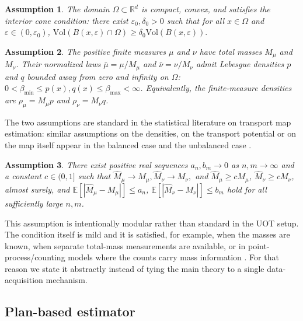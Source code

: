 \documentclass[11pt,reqno]{amsart}
\newtheorem{assumption}{Assumption}
\theoremstyle{definition}
\renewcommand{\hat}{\widehat}
\newcommand{\Ep}{\mathbb{E}}
\renewcommand{\epsilon}{\varepsilon}
\begin{document}
\begin{assumption}
\label{assm:supp_global}
The domain $\Omega \subset \mathbb{R}^d$ is compact, convex, and satisfies the interior cone condition: there exist $\epsilon_0, \delta_0 > 0$ such that for all $x \in \Omega$ and $\epsilon \in (0, \epsilon_0)$,
$
    \mathrm{Vol}(B(x,\epsilon) \cap \Omega) \geq \delta_0 \mathrm{Vol}(B(x,\epsilon)).
$
\end{assumption}



\begin{assumption}
\label{assm:positivity}
The positive finite measures $\mu$ and $\nu$ have total masses $M_\mu$ and $M_\nu$. Their normalized laws $\bar\mu=\mu/M_\mu$ and $\bar\nu=\nu/M_\nu$ admit Lebesgue densities $p$ and $q$ bounded away from zero and infinity on $\Omega$: $0<\beta_{\min}\le p(x),q(x)\le\beta_{\max}<\infty$. Equivalently, the finite-measure densities are $\rho_\mu=M_\mu p$ and $\rho_\nu=M_\nu q$.
\end{assumption}
The two assumptions are standard in the statistical literature on transport map estimation: similar assumptions on the densities, on the transport potential or on the map itself appear in the balanced case \cite{hutter2021minimax,manole2024plugin,balakrishnan2025stability} and the unbalanced case \cite{gallouet2025regularity}.




\begin{assumption}\label{assm:masses}
There exist positive real sequences $a_n, b_m \to 0$ as $n,m \to \infty$ and a constant $c\in(0,1]$ such that
$
    \hat M_\mu \to M_\mu,
    \hat M_\nu \to M_\nu,
$ and
$\hat M_\mu \ge c M_\mu$, $\hat M_\nu \ge c M_\nu$, almost surely,
and $\Ep[|\hat M_\mu-M_\mu|] \le a_n$, $\Ep[|\hat M_\nu-M_\nu|] \le b_m$ hold for all sufficiently large $n,m$.
\end{assumption}
This assumption is intentionally modular rather than standard in the UOT setup. 
The condition itself is mild and it is satisfied, for example, when the masses are known, when separate total-mass measurements are available, or in point-process/counting models where the counts carry mass information \cite{HundrieserEtAl2025,struleva2025sharp}. For that reason we state it abstractly instead of tying the main theory to a single data-acquisition mechanism.



\subsection{Plan-based estimator}
\end{document}
